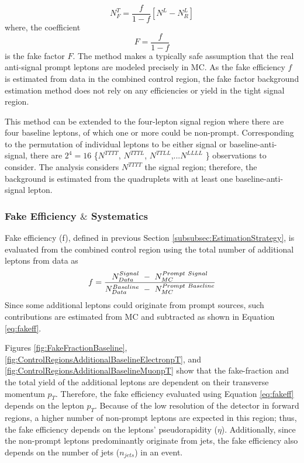 \begin{equation}
    N_{F}^{T} =  \frac{f}{1-f}[N^{L}-N^{L}_{R}]
\label{eqn:NfakeSignalFinal}
\end{equation}
where, the coefficient \begin{equation} F=\frac{f}{1-f} \label{eqn:FakeFactor}
\end{equation} is the fake factor $F$. The method makes a typically safe assumption that the real anti-signal prompt leptons are modeled precisely in MC. As the fake efficiency $f$ is estimated from data in the combined control region, the fake factor background estimation method does not rely on any efficiencies or yield in the tight signal region.

This method can be extended to the four-lepton signal region where there are four baseline leptons, of which one or more could be non-prompt. Corresponding to the permutation of individual leptons to be either signal or baseline-anti-signal, there are $2^{4}=16$ \{$N^{TTTT}$, $N^{TTTL}$, $N^{TTLL}$,...$N^{LLLL}$ \} observations to consider. The analysis considers $N^{TTTT}$ the signal region; therefore, the background is estimated from the quadruplets with at least one baseline-anti-signal lepton.

\subsubsection{Fake Efficiency $\&$ Systematics}
\label{subsubsec:FakeEff}
Fake efficiency (f), defined in previous Section \ref{subsubsec:EstimationStrategy}, is evaluated from the combined control region using the total number of additional leptons from data as
\begin{equation}{\label{eq:fakeff}}
\begin{aligned}
f = \frac{ N_{Data}^{Signal}~-~N_{MC}^{Prompt~Signal}}{ N_{Data}^{Baseline}~-~N_{MC}^{Prompt~Baseline}}
\end{aligned}
\end{equation}
Since some additional leptons could originate from prompt sources, such contributions are estimated from MC and subtracted as shown in Equation \ref{eq:fakeff}.

Figures \ref{fig:FakeFractionBaseline}, \ref{fig:ControlRegionsAdditionalBaselineElectronpT}, and \ref{fig:ControlRegionsAdditionalBaselineMuonpT} show that the fake-fraction and the total yield of the additional leptons are dependent on their transverse momentum $p_{T}$. Therefore, the fake efficiency evaluated using Equation \ref{eq:fakeff} depends on the lepton $p_{T}$. Because of the low resolution of the detector in forward regions, a higher number of non-prompt leptons are expected in this region; thus, the fake efficiency depends on the leptons' pseudorapidity ($\eta$). Additionally, since the non-prompt leptons predominantly originate from jets, the fake efficiency also depends on the number of jets ($n_{jets}$) in an event. 


